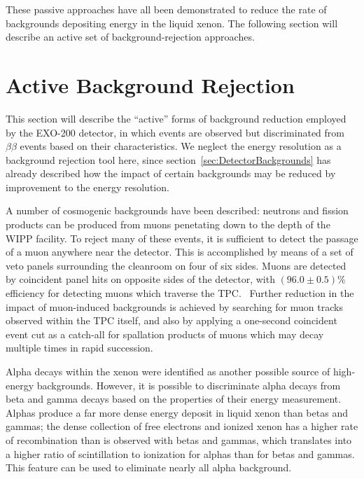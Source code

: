 These passive approaches have all been demonstrated to reduce the rate of backgrounds depositing energy in the liquid xenon.  The following section will describe an active set of background-rejection approaches.

\section{Active Background Rejection}\label{sec:DetectorActiveBackgroundRejection}

This section will describe the ``active'' forms of background reduction employed by the EXO-200 detector, in which events are observed but discriminated from $\beta\beta$ events based on their characteristics.  We neglect the energy resolution as a background rejection tool here, since section~\ref{sec:DetectorBackgrounds} has already described how the impact of certain backgrounds may be reduced by improvement to the energy resolution.

A number of cosmogenic backgrounds have been described: neutrons and fission products can be produced from muons penetating down to the depth of the WIPP facility.  To reject many of these events, it is sufficient to detect the passage of a muon anywhere near the detector.  This is accomplished by means of a set of veto panels surrounding the cleanroom on four of six sides.  Muons are detected by coincident panel hits on opposite sides of the detector, with $(96.0 \pm 0.5)\%$ efficiency for detecting muons which traverse the TPC.~\cite{detectorPartI}  Further reduction in the impact of muon-induced backgrounds is achieved by searching for muon tracks observed within the TPC itself, and also by applying a one-second coincident event cut as a catch-all for spallation products of muons which may decay multiple times in rapid succession.

Alpha decays within the xenon were identified as another possible source of high-energy backgrounds.  However, it is possible to discriminate alpha decays from beta and gamma decays based on the properties of their energy measurement.  Alphas produce a far more dense energy deposit in liquid xenon than betas and gammas; the dense collection of free electrons and ionized xenon has a higher rate of recombination than is observed with betas and gammas, which translates into a higher ratio of scintillation to ionization for alphas than for betas and gammas.  This feature can be used to eliminate nearly all alpha background.

